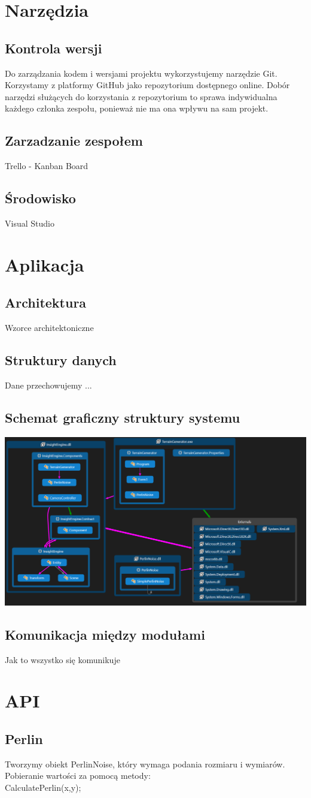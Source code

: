 \documentclass[12pt,a4paper]{article}
\begin{document}
\section{Narzędzia}
\subsection{Kontrola wersji}
Do zarządzania kodem i wersjami projektu wykorzystujemy narzędzie Git. Korzystamy z platformy GitHub jako repozytorium dostępnego online. Dobór narzędzi służących do korzystania z repozytorium to sprawa indywidualna każdego członka zespołu, ponieważ nie ma ona wpływu na sam projekt.
\subsection{Zarzadzanie zespołem}
Trello - Kanban Board
\subsection{Środowisko}
Visual Studio
\section{Aplikacja}
\subsection{Architektura}
Wzorce architektoniczne
\subsection{Struktury danych}
Dane przechowujemy ...
\subsection{Schemat graficzny struktury systemu}
\includegraphics[width=1\textwidth]{images/klasy.png}
\subsection{Komunikacja między modułami}
Jak to wszystko się komunikuje
\section{API}
\subsection{Perlin}
Tworzymy obiekt PerlinNoise, który wymaga podania rozmiaru i wymiarów.
Pobieranie wartości za pomocą metody:\\
CalculatePerlin(x,y);
\end{document}
